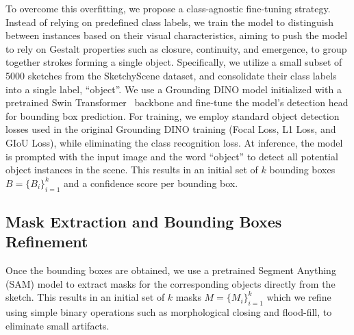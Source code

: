 To overcome this overfitting, we propose a class-agnostic fine-tuning strategy. Instead of relying on predefined class labels, we train the model to distinguish between instances based on their visual characteristics, aiming to push the model to rely on Gestalt properties such as closure, continuity, and emergence, to group together strokes forming a single object. Specifically, we utilize a small subset of 5000 sketches from the SketchyScene dataset, and consolidate their class labels into a single label, ``object''.  We use a Grounding DINO model initialized with a pretrained Swin Transformer~\cite{liu2021Swin} backbone and fine-tune the model's detection head for bounding box prediction. For training, we employ standard object detection losses used in the original Grounding DINO training (Focal Loss, L1 Loss, and GIoU Loss), while eliminating the class recognition loss. At inference, the model is prompted with the input image and the word ``object'' to detect all potential object instances in the scene. This results in an initial set of $k$ bounding boxes $B=\{B_i\}_{i=1}^k$ and a confidence score per bounding box. 

\vspace{-2mm}
\subsection{Mask Extraction and Bounding Boxes Refinement}
Once the bounding boxes are obtained, we use a pretrained Segment Anything (SAM) model \cite{kirillov2023segany} to extract masks for the corresponding objects directly from the sketch. This results in an initial set of $k$ masks $M=\{M_i\}_{i=1}^k$ which we refine using simple binary operations such as morphological closing and flood-fill, to eliminate small artifacts.

